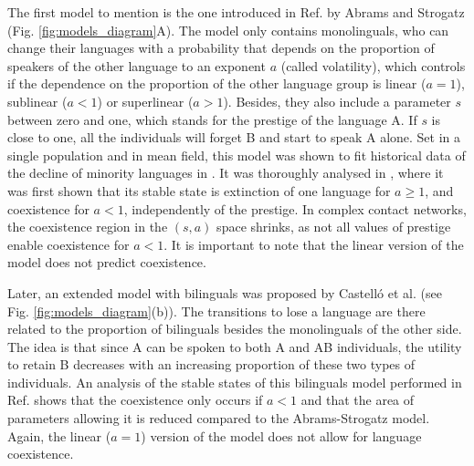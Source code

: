 \documentclass[../thesis.tex]{subfiles}
\begin{document}
The first model to mention is the one introduced in Ref.
\cite{AbramsModellingDynamics2003} by Abrams and Strogatz (Fig.
\cref{fig:models_diagram}A). The model only contains monolinguals, who can change their
languages with a probability that depends on the proportion of speakers of the other
language to an exponent $a$ (called volatility), which controls if the dependence on the
proportion of the other language group is linear ($a = 1$), sublinear ($a<1$) or
superlinear ($a>1$). Besides, they also include a parameter $s$ between zero and one,
which stands for the prestige of the language A. If $s$ is close to one, all the
individuals will forget B and start to speak A alone. Set in a single population and in
mean field, this model was shown to fit historical data of the decline of minority
languages in \cite{AbramsModellingDynamics2003}. It was thoroughly analysed in
\cite{VazquezAgentBased2010}, where it was first shown that its stable state is
extinction of one language for $a \ge 1$, and coexistence for $a < 1$, independently of
the prestige. In complex contact networks, the coexistence region in the $(s, a)$ space
shrinks, as not all values of prestige enable coexistence for $a < 1$. It is important
to note that the linear version of the model does not predict coexistence.    

Later, an extended model with bilinguals was proposed by Castell\'o et al.
\cite{CastelloOrderingDynamics2006} (see Fig. \cref{fig:models_diagram}(b)). The
transitions to lose a language are there related to the proportion of bilinguals besides
the monolinguals of the other side. The idea is that since A can be spoken to both A and
AB individuals, the utility to retain B decreases with an increasing proportion of these
two types of individuals. An analysis of the stable states of this bilinguals model
performed in Ref. \cite{VazquezAgentBased2010} shows that the coexistence only occurs if
$a < 1$ and that the area of parameters allowing it is reduced compared to the
Abrams-Strogatz model. Again, the linear ($a = 1$) version of the model does not allow
for language coexistence.
\end{document}
